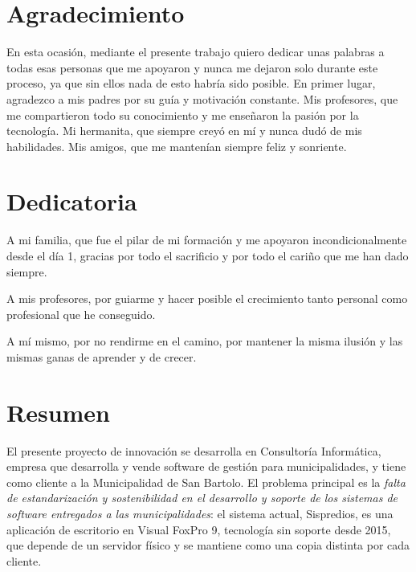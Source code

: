 \documentclass[12pt,a4paper]{report}
\begin{document}


\chapter*{Agradecimiento}

\hspace{1.25cm}En esta ocasión, mediante el presente trabajo quiero dedicar unas palabras a todas esas personas que me apoyaron y nunca me dejaron solo durante este proceso, ya que sin ellos nada de esto habría sido posible.
En primer lugar, agradezco a mis padres por su guía y motivación constante. Mis profesores, que me compartieron todo su conocimiento y me enseñaron la pasión por la tecnología. Mi hermanita, que siempre creyó en mí y nunca dudó de mis habilidades. Mis amigos, que me mantenían siempre feliz y sonriente.

\clearpage

\chapter*{Dedicatoria}

\hspace{1.25cm}A mi familia, que fue el pilar de mi formación y me apoyaron incondicionalmente desde el día 1, gracias por todo el sacrificio y por todo el cariño que me han dado siempre.

A mis profesores, por guiarme y hacer posible el crecimiento tanto personal como profesional que he conseguido.

A mí mismo, por no rendirme en el camino, por mantener la misma ilusión y las mismas ganas de aprender y de crecer.

\clearpage

\chapter*{Resumen}

El presente proyecto de innovación se desarrolla en Consultoría Informática, empresa que desarrolla y vende software de gestión para municipalidades, y tiene como cliente a la Municipalidad de San Bartolo. El problema principal es la \textit{falta de estandarización y sostenibilidad en el desarrollo y soporte de los sistemas de software entregados a las municipalidades}: el sistema actual, Sispredios, es una aplicación de escritorio en Visual FoxPro 9, tecnología sin soporte desde 2015, que depende de un servidor físico y se mantiene como una copia distinta por cada cliente.
\end{document}
